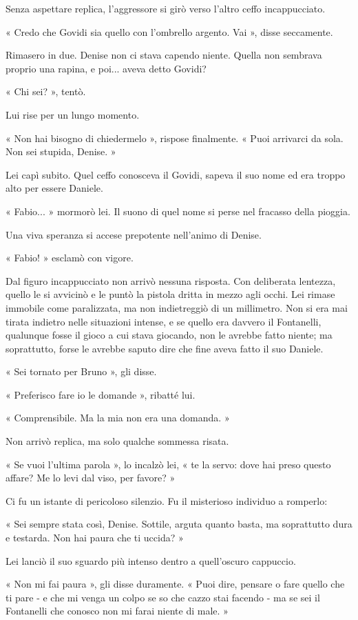 Senza aspettare replica, l'aggressore si girò verso l'altro ceffo incappucciato.

« Credo che Govidi sia quello con l'ombrello argento. Vai », disse seccamente.

Rimasero in due. Denise non ci stava capendo niente. Quella non sembrava proprio una rapina, e poi... aveva detto Govidi?

« Chi sei? », tentò.

Lui rise per un lungo momento.

« Non hai bisogno di chiedermelo », rispose finalmente. « Puoi arrivarci da sola. Non sei stupida, Denise. »

Lei capì subito. Quel ceffo conosceva il Govidi, sapeva il suo nome ed era troppo alto per essere Daniele.

« Fabio... » mormorò lei. Il suono di quel nome si perse nel fracasso della pioggia.

Una viva speranza si accese prepotente nell'animo di Denise.

« Fabio! » esclamò con vigore.

Dal figuro incappucciato non arrivò nessuna risposta. Con deliberata lentezza, quello le si avvicinò e le puntò la pistola dritta in mezzo agli occhi. Lei rimase immobile come paralizzata, ma non indietreggiò di un millimetro. Non si era mai tirata indietro nelle situazioni intense, e se quello era davvero il Fontanelli, qualunque fosse il gioco a cui stava giocando, non le avrebbe fatto niente; ma soprattutto, forse le avrebbe saputo dire che fine aveva fatto il suo Daniele.

« Sei tornato per Bruno », gli disse.

« Preferisco fare io le domande », ribatté lui.

« Comprensibile. Ma la mia non era una domanda. »

Non arrivò replica, ma solo qualche sommessa risata.

« Se vuoi l'ultima parola », lo incalzò lei, « te la servo: dove hai preso questo affare? Me lo levi dal viso, per favore? »

Ci fu un istante di pericoloso silenzio. Fu il misterioso individuo a romperlo:

« Sei sempre stata così, Denise. Sottile, arguta quanto basta, ma soprattutto dura e testarda. Non hai paura che ti uccida? »

Lei lanciò il suo sguardo più intenso dentro a quell'oscuro cappuccio.

« Non mi fai paura », gli disse duramente. « Puoi dire, pensare o fare quello che ti pare - e che mi venga un colpo se so che cazzo stai facendo - ma se sei il Fontanelli che conosco non mi farai niente di male. »

